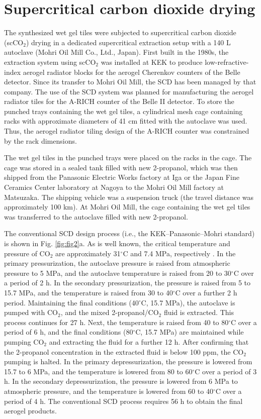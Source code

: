 \documentclass[5p,twocolumn]{elsarticle}
\begin{document}
\section{Supercritical carbon dioxide drying}
\label{3}

The synthesized wet gel tiles were subjected to supercritical carbon dioxide (scCO$_2$) drying in a dedicated supercritical extraction setup with a 140 L autoclave (Mohri Oil Mill Co., Ltd., Japan). First built in the 1980s, the extraction system using scCO$_2$ was installed at KEK to produce low-refractive-index aerogel radiator blocks for the aerogel Cherenkov counters of the Belle detector. Since its transfer to Mohri Oil Mill, the SCD has been managed by that company. The use of the SCD system was planned for manufacturing the aerogel radiator tiles for the A-RICH counter of the Belle II detector. To store the punched trays containing the wet gel tiles, a cylindrical mesh cage containing racks with approximate diameters of 41 cm fitted with the autoclave was used. Thus, the aerogel radiator tiling design of the A-RICH counter was constrained by the rack dimensions.

The wet gel tiles in the punched trays were placed on the racks in the cage. The cage was stored in a sealed tank filled with new 2-propanol, which was then shipped from the Panasonic Electric Works factory at Iga or the Japan Fine Ceramics Center laboratory at Nagoya to the Mohri Oil Mill factory at Matsuzaka. The shipping vehicle was a suspension truck (the travel distance was approximately 100 km). At Mohri Oil Mill, the cage containing the wet gel tiles was transferred to the autoclave filled with new 2-propanol.

The conventional SCD design process (i.e., the KEK--Panasonic--Mohri standard) is shown in Fig. \ref{fig:fig2}a. As is well known, the critical temperature and pressure of CO$_2$ are approximately 31$^{\circ }$C and 7.4 MPa, respectively \cite{cite19}. In the primary pressurization, the autoclave pressure is raised from atmospheric pressure to 5 MPa, and the autoclave temperature is raised from 20 to 30$^{\circ }$C over a period of 2 h. In the secondary pressurization, the pressure is raised from 5 to 15.7 MPa, and the temperature is raised from 30 to 40$^{\circ }$C over a further 2 h period. Maintaining the final conditions (40$^{\circ }$C, 15.7 MPa), the autoclave is pumped with CO$_2$, and the mixed 2-propanol/CO$_2$ fluid is extracted. This process continues for 27 h. Next, the temperature is raised from 40 to 80$^{\circ }$C over a period of 6 h, and the final conditions (80$^{\circ }$C, 15.7 MPa) are maintained while pumping CO$_2$ and extracting the fluid for a further 12 h. After confirming that the 2-propanol concentration in the extracted fluid is below 100 ppm, the CO$_2$ pumping is halted. In the primary depressurization, the pressure is lowered from 15.7 to 6 MPa, and the temperature is lowered from 80 to 60$^{\circ }$C over a period of 3 h. In the secondary depressurization, the pressure is lowered from 6 MPa to atmospheric pressure, and the temperature is lowered from 60 to 40$^{\circ }$C over a period of 4 h. The conventional SCD process requires 56 h to obtain the final aerogel products.
\end{document}
